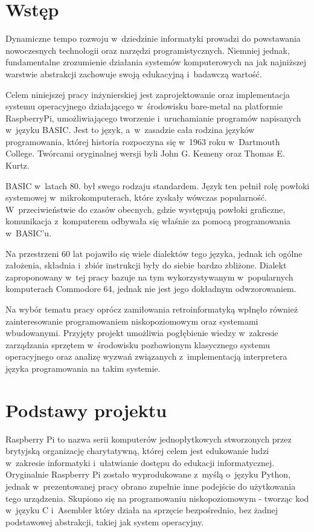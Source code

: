 \documentclass[shortabstract]{iithesis}
\author         {Aleksandra Kosińska \and Cezary Stajszczyk}
\date           {31 sierpnia 2023}                     %
\begin{document}

\chapter*{Wstęp}
Dynamiczne tempo rozwoju w~dziedzinie informatyki prowadzi do powstawania nowoczesnych technologii oraz narzędzi programistycznych. Niemniej jednak, fundamentalne zrozumienie działania systemów komputerowych na jak najniższej warstwie abstrakcji zachowuje swoją edukacyjną i~badawczą wartość.

Celem niniejszej pracy inżynierskiej jest zaprojektowanie oraz implementacja systemu operacyjnego działającego w~środowisku bare-metal na platformie RaspberryPi, umożliwiającego tworzenie i~uruchamianie programów napisanych w~języku BASIC. Jest to język, a~w~zasadzie cała rodzina języków programowania, której historia rozpoczyna się w~1963 roku w~Dartmouth College. Twórcami oryginalnej wersji byli John G. Kemeny oraz Thomas E. Kurtz. 

BASIC w~latach 80. był swego rodzaju standardem. Język ten pełnił rolę powłoki systemowej w~mikrokomputerach, które zyskały wówczas popularność. W~przeciwieństwie do czasów obecnych, gdzie występują powłoki graficzne, komunikacja z~komputerem odbywała się właśnie za pomocą programowania w~BASIC'u.

Na przestrzeni 60 lat pojawiło się wiele dialektów tego języka, jednak ich ogólne założenia, składnia i~zbiór instrukcji były do siebie bardzo zbliżone. Dialekt zaproponowany w~tej pracy bazuje na tym wykorzystywanym w~popularnych komputerach Commodore 64, jednak nie jest jego dokładnym odwzorowaniem.

Na wybór tematu pracy oprócz zamiłowania retroinformatyką wpłnęło również zainteresowanie programowaniem niskopoziomowym oraz systemami wbudowanymi. Przyjęty projekt umożliwia pogłębienie wiedzy w~zakresie zarządzania sprzętem w~środowisku pozbawionym klasycznego systemu operacyjnego oraz analizę wyzwań związanych z~implementacją interpretera języka programowania na takim systemie.


\chapter{Podstawy projektu}
Raspberry Pi to nazwa serii komputerów jednopłytkowych stworzonych przez brytyjską organizację charytatywną, której celem jest edukowanie ludzi w~zakresie informatyki i~ułatwianie dostępu do edukacji informatycznej. Oryginalnie Raspberry Pi zostało wyprodukowane z~myślą o~języku Python, jednak w~prezentowanej pracy obrano zupełnie inne podejście do użytkowania tego urządzenia. Skupiono się na programowaniu niskopoziomowym - tworząc kod w~języku C i~Asembler który działa na sprzęcie bezpośrednio, bez żadnej podstawowej abstrakcji, takiej jak system operacyjny.
\end{document}
